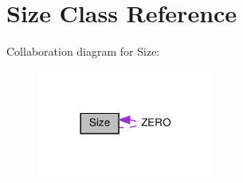 \hypertarget{classSize}{}\section{Size Class Reference}
\label{classSize}


Collaboration diagram for Size\+:
\nopagebreak
\begin{figure}[H]
\begin{center}
\leavevmode
\includegraphics[width=165pt]{classSize__coll__graph}
\end{center}
\end{figure}
